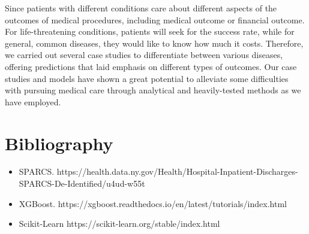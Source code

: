 \documentclass[12pt]{article}
\begin{document}
\noindent Since patients with different conditions care about different aspects of the outcomes of medical procedures, including medical outcome or financial outcome. For life-threatening conditions, patients will seek for the success rate, while for general, common diseases, they would like to know how much it costs. Therefore, we carried out several case studies to differentiate between various diseases, offering predictions that laid emphasis on different types of outcomes. Our case studies and models have shown a great potential to alleviate some difficulties with pursuing medical care through analytical and heavily-tested methods as we have employed.

\section{Bibliography}
\begin{itemize}
    \item SPARCS. https://health.data.ny.gov/Health/Hospital-Inpatient-Discharges-SPARCS-De-Identified/u4ud-w55t
    \item XGBoost. https://xgboost.readthedocs.io/en/latest/tutorials/index.html
    \item Scikit-Learn https://scikit-learn.org/stable/index.html
\end{itemize}
\end{document}
